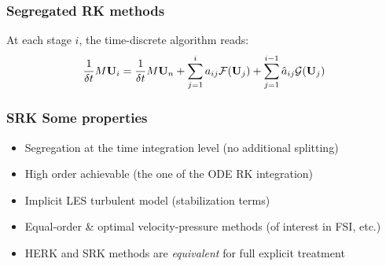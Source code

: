 \begin{frame}
\frametitle{Segregated RK methods}
At each stage $ i $, the time-discrete algorithm reads:
\begin{align*}
\frac{1}{\delta t}M{\bf U}_i=\frac{1}{\delta t}M{\bf U}_n+\sum_{j=1}^ia_{ij}\mathcal{F}({\bf U}_j)+\sum_{j=1}^{i-1}\hat{a}_{ij}\mathcal{G}({\bf U}_j)
\end{align*}
\begin{overprint}
\end{overprint}
\end{frame}
\begin{frame}
\frametitle{SRK Some properties}
\vfill
\begin{itemize}
\item Segregation at the time integration level (no additional splitting)
\item High order achievable (the one of the ODE RK integration)
\item Implicit LES turbulent model (stabilization terms)
\item Equal-order \& optimal velocity-pressure methods (of interest in FSI, etc.)
\item HERK and SRK methods are \emph{equivalent} for full explicit treatment
\end{itemize}
\vfill
\end{frame}

